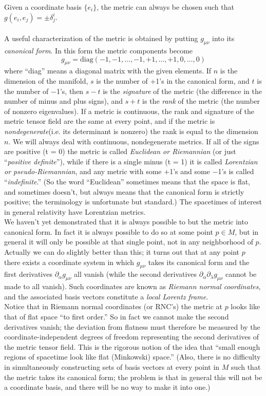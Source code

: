 Given a coordinate basis $\{e_i\}$, the metric can always be chosen such that $g(e_i, e_j)=\pm \delta^i_j$.\\
\\
A useful characterization of the metric is obtained by putting $g_{\mu \nu}$ into its \emph{canonical
form}. In this form the metric components become
\begin{equation}
	g_{\mu \nu} = \mathrm{diag}\left(-1, -1, \dots, -1, +1, \dots, +1, 0,\dots , 0\right)
\end{equation}
where “diag” means a diagonal matrix with the given elements. If $n$ is the dimension of
the manifold, $s$ is the number of +1’s in the canonical form, and $t$ is the number of −1’s,
then $s − t$ is the \emph{signature} of the metric (the difference in the number of minus and plus
signs), and $s + t$ is the \emph{rank} of the metric (the number of nonzero eigenvalues). If a metric
is continuous, the rank and signature of the metric tensor field are the same at every point,
and if the metric is \emph{nondegenerate}(i.e. its determinant is nonzero) the rank is equal to the dimension $n$. We will always deal
with continuous, nondegenerate metrics. If all of the signs are positive (t = 0) the metric
is called \emph{Euclidean or Riemannian} (or just “\emph{positive definite}”), while if there is a single
minus (t = 1) it is called \emph{Lorentzian or pseudo-Riemannian}, and any metric with some
+1’s and some −1’s is called “\emph{indefinite}.” (So the word “Euclidean” sometimes means that
the space is flat, and sometimes doesn’t, but always means that the canonical form is strictly
positive; the terminology is unfortunate but standard.) The spacetimes of interest in general
relativity have Lorentzian metrics.\\
We haven’t yet demonstrated that it is always possible to but the metric into canonical
form. In fact it is always possible to do so at some point $p \in M$, but in general it will only be possible at that single point, not in any neighborhood of $p$. Actually we can do
slightly better than this; it turns out that at any point $p$ there exists a coordinate system in
which $g_{\mu \nu}$ takes its canonical form and the first derivatives $\partial_{\alpha} g_{\mu \nu}$ all vanish (while the second
derivatives $\partial_{\alpha} \partial_{\lambda} g_{\mu \nu}$ cannot be made to all vanish). Such coordinates are known as \emph{Riemann
normal coordinates}, and the associated basis vectors constitute a \emph{local Lorentz frame}.\\
Notice that in Riemann normal coordinates (or RNC’s) the metric at $p$ looks like that of flat
space “to first order.” So in fact we cannot make the second derivatives vanish;
the deviation from flatness must therefore be measured by the coordinate-independent
degrees of freedom representing the second derivatives of the metric tensor field. This is the rigorous notion of the idea that “small enough regions of
spacetime look like flat (Minkowski) space.” (Also, there is no difficulty in simultaneously
constructing sets of basis vectors at every point in $M$ such that the metric takes its canonical
form; the problem is that in general this will not be a coordinate basis, and there will be no
way to make it into one.)


